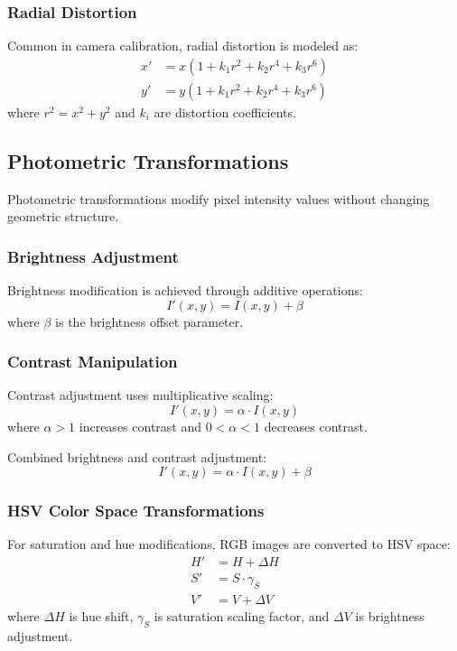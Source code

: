 \documentclass[a4paper, journal]{IEEEtran}
\begin{document}
\subsubsection{Radial Distortion}
Common in camera calibration, radial distortion is modeled as:
\begin{equation}
    \begin{aligned}
        x' & = x(1 + k_1r^2 + k_2r^4 + k_3r^6) \\
        y' & = y(1 + k_1r^2 + k_2r^4 + k_3r^6)
    \end{aligned}
\end{equation}
where $r^2 = x^2 + y^2$ and $k_i$ are distortion coefficients.

\subsection{Photometric Transformations}
Photometric transformations modify pixel intensity values without changing geometric structure.

\subsubsection{Brightness Adjustment}
Brightness modification is achieved through additive operations:
\begin{equation}
    I'(x,y) = I(x,y) + \beta
\end{equation}
where $\beta$ is the brightness offset parameter.

\subsubsection{Contrast Manipulation}
Contrast adjustment uses multiplicative scaling:
\begin{equation}
    I'(x,y) = \alpha \cdot I(x,y)
\end{equation}
where $\alpha > 1$ increases contrast and $0 < \alpha < 1$ decreases contrast.

Combined brightness and contrast adjustment:
\begin{equation}
    I'(x,y) = \alpha \cdot I(x,y) + \beta
\end{equation}

\subsubsection{HSV Color Space Transformations}
For saturation and hue modifications, RGB images are converted to HSV space:
\begin{equation}
    \begin{aligned}
        H' & = H + \Delta H     \\
        S' & = S \cdot \gamma_S \\
        V' & = V + \Delta V
    \end{aligned}
\end{equation}
where $\Delta H$ is hue shift, $\gamma_S$ is saturation scaling factor, and $\Delta V$ is brightness adjustment.
\end{document}
